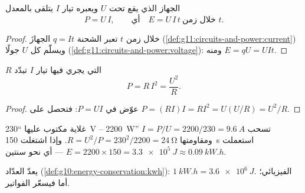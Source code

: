 \begin{proposition}\label{prop:g11:circuits-and-power:power}
الجهاز الذي يقع تحت  $U$ ويعبره تيار $I$ يتلقى  بالمعدل
\[ P = U\,I , \qquad\text{أي}\quad E = U\,I\,t \ \text{خلال زمن } t . \]
\end{proposition}

\begin{proof}
خلال زمن $t$ تعبر الشحنة $q = It$ الجهازَ
(\cref{def:g11:circuits-and-power:current}) ويسلّم كل 
$U$ جولًا (\cref{def:g11:circuits-and-power:voltage}): ومنه $E = qU = UIt$.
\end{proof}

\begin{proposition}\label{prop:g11:circuits-and-power:ri2}
 $R$ التي يجري فيها تيار $I$ تبدّد
\[ P = R\,I^2 = \frac{U^2}{R} . \]
\end{proposition}

\begin{proof}
عوّض  في $P = UI$: فتحصل على $P = (RI)I = RI^2 = U(U/R) = U^2/R$.
\end{proof}

\begin{example}\label{ex:g11:circuits-and-power:nameplate}
غلاية مكتوب عليها ``\qty{230}{V} -- \qty{2200}{W}'' تسحب $I = P/U =
2200/230 = \qty{9.6}{A}$ ومقاومتها $R = U^2/P = 230^2/2200 =
\qty{24}{\ohm}$. وإذا اشتغلت \qty{150}{s} استعملت $E = 2200 \times 150 =
\qty{3.3e5}{J} \approx \qty{0.09}{kW.h}$ --- أي نحو سنتين.
\end{example}

\begin{remark}\label{rem:g11:circuits-and-power:kwh}
يعدّ العدّاد  (\cref{def:g10:energy-conservation:kwh}):
$\qty{1}{kW.h} = \qty{3.6e6}{J}$.   الفيزيائي؛
أما  فيسعّر الفواتير.
\end{remark}

